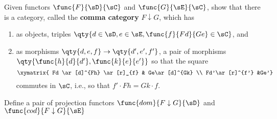 \documentclass[main.tex]{subfiles}
\begin{document}

\begin{exercise}
	Given functors $\func{F}{\sD}{\sC}$ and $\func{G}{\sE}{\sC}$, show that
	there is a category, called the {\bf comma category} $F\downarrow G$, which
	has
	\begin{enumerate}
		\item as objects, triples $\qty{d \in \sD,e \in \sE, \func{f}{Fd}{Ge}
			\in \sC}$, and

		\item as morphisms $\qty{d,e,f}\rightarrow \qty{d',e',f'}$, a pair of
			morphisms $\qty{\func{h}{d}{d'},\func{k}{e}{e'}}$ so that the square
			\[\xymatrix{
					Fd \ar[d]^{Fh} \ar[r]_{f} & Ge\ar[d]^{Gk}  \\
			Fd'\ar[r]^{f'} &Ge'}\]
			commutes in $\sC$, i.e., so that $f' \cdot Fh = Gk \cdot f$.
	\end{enumerate}
	Define a pair of projection functors $\func{dom}{F\downarrow G}{\sD}$ and
	$\func{cod}{F\downarrow G}{\sE}$
\end{exercise}
\end{document}
